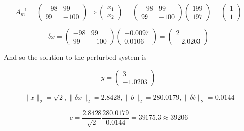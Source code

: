 \documentclass{article}
\begin{document}
\[A_m^{-1} = \left(\begin{array}{cc} -98 & 99 \\ 99 & -100 \end{array}\right) \Longrightarrow \left(\begin{array}{c} x_1 \\ x_2 \end{array}\right) = \left(\begin{array}{cc} -98 & 99 \\ 99 & -100 \end{array}\right) \left(\begin{array}{c} 199 \\ 197 \end{array}\right) = \left(\begin{array}{c} 1 \\ 1 \end{array}\right) \]

\[\delta x = \left(\begin{array}{cc} -98 & 99 \\ 99 & -100 \end{array}\right) \left(\begin{array}{c} -0.0097 \\ 0.0106 \end{array}\right) = \left(\begin{array}{c} 2 \\ -2.0203 \end{array}\right) \]

And so the solution to the perturbed system is 

\[ y = \left(\begin{array}{c} 3 \\ -1.0203 \end{array}\right) \]

\[ \|x\|_2 = \sqrt{2}, \|\delta x \|_2 = 2.8428, \|b\|_2 = 280.0179, \|\delta b\|_2 = 0.0144 \]

\[ c = \dfrac{2.8428}{\sqrt{2}} \dfrac{280.0179}{0.0144} = 39175.3 \approx 39206\]
\end{document}
